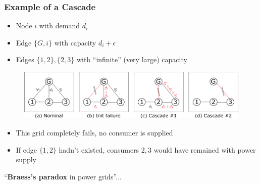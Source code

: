 \documentclass{beamer}
\begin{document}
\begin{frame}
\frametitle{Example of a Cascade}
\begin{itemize}
	\item Node $i$ with demand $d_i$
	\item Edge $\{G,i\}$ with capacity $d_i+\epsilon$
	\item Edges $\{1,2\}, \{2,3\}$ with ``infinite'' (very large) capacity
\end{itemize}

\begin{figure}
\includegraphics[width=1\textwidth]{Aux_files/figure_3_full.pdf}
\end{figure}

\begin{itemize}
	\pause\item This grid completely fails, no consumer is supplied
	\pause\item If edge $\{1,2\}$ hadn't existed, consumers $2,3$ would have remained with power supply
\end{itemize}

\pause ``\textbf{Braess's paradox} in power grids''...
\end{frame}

\end{document}
